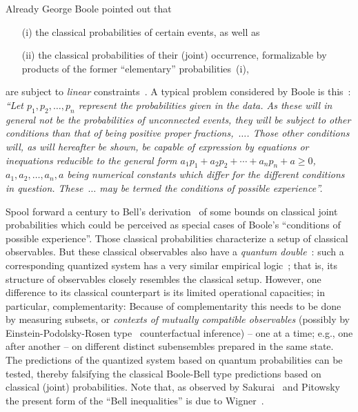 Already George Boole pointed out that
\begin{itemize}
\item[(i)] the classical probabilities of certain events, as well as
\item[(ii)] the classical probabilities of their (joint) occurrence,
formalizable by products of the former ``elementary'' probabilities~(i),
\end{itemize}
are subject to {\em linear}
constraints~\cite{Boole,Boole-62,Frechet1935,Hailperin-1965,Hailperin-86,Ursic1984,Ursic:1986:GFL:3023712.3023752,Ursic1988,Beltrametti-1991,Pykacz-1991,Pulmannova-1992,Beltrametti-1993,Beltrametti-1994,DvurLaen-1994,Beltrametti1995,Beltrametti-1995,Noce-1995,Laenger1995,DvurLaen-1995,DvurLaen-1995b,Beltrametti-1996,Pulmannova-2002}.
A typical problem considered by Boole is this~\cite[p.~229]{Boole-62}:
{\em ``Let $p_1, p_2,\ldots , p_n$ represent the probabilities given in the data. As
these will in general not be the probabilities of unconnected events, they will be subject
to other conditions than that of being positive proper fractions,~$\ldots$.
Those other conditions will, as will hereafter be shown, be capable of expression by
equations or inequations reducible to the general form
$a_1 p_1 + a_2p_2 + \cdots + a_n p_n +a \ge 0$,
$a_1, a_2, \ldots , a_n,a$ being numerical constants which differ for the different conditions in
question. These~$\ldots$ may be termed the conditions of possible
experience''.}

Spool forward a century to
Bell's derivation~\cite{bell} of some bounds on classical joint probabilities
which could be perceived as special cases of Boole's ``conditions of possible
experience''.
Those classical probabilities characterize a setup of classical observables.
But these classical observables also have a {\em quantum double}~\cite{Arthaud}:
such a corresponding quantized system
has a very similar empirical logic~\cite{Foulis1976}; that is, its structure of observables closely resembles the classical setup.
However, one difference to its classical counterpart is its limited operational capacities;
in particular, complementarity: Because of complementarity this needs to be done by measuring subsets, or {\em contexts
of mutually compatible observables}
(possibly by Einstein-Podolsky-Rosen type~\cite{epr} counterfactual inference) -- one at a time; e.g., one after another --
on different distinct subensembles prepared in the same state.
The predictions of the quantized system based on quantum probabilities can be tested,
thereby falsifying the classical Boole-Bell
type predictions based on classical (joint) probabilities.
Note that, as observed by Sakurai~\cite[p.~241-243]{Sakurai-1994} and  Pitowsky~\cite[Footnote~13]{pitowsky-89a}
the present form of the ``Bell inequalities'' is due to Wigner~\cite{wigner-70,Fine-82}.


